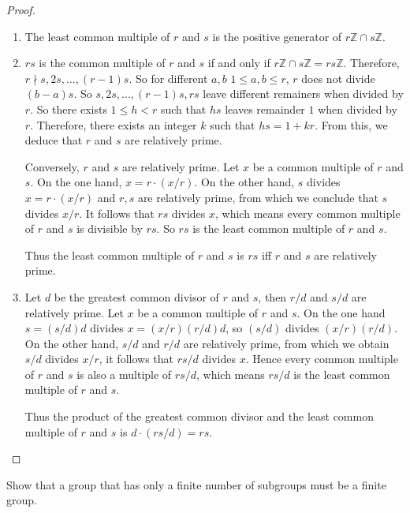 \begin{proof}
    \begin{enumerate}[label={\textbf{\alph*.}}]
        \item The least common multiple of $r$ and $s$ is the positive generator of $r\mathbb{Z}\cap s\mathbb{Z}$.
        \item $rs$ is the common multiple of $r$ and $s$ if and only if $r\mathbb{Z}\cap s\mathbb{Z} = rs\mathbb{Z}$. Therefore, $r \nmid s, 2s, \ldots, (r-1)s$. So for different $a, b$ $1\leq a, b \leq r$, $r$ does not divide $(b - a)s$. So $s, 2s, \ldots, (r-1)s, rs$ leave different remainers when divided by $r$. So there exists $1 \leq h < r$ such that $hs$ leaves remainder $1$ when divided by $r$. Therefore, there exists an integer $k$ such that $hs = 1 + kr$. From this, we deduce that $r$ and $s$ are relatively prime.

              Conversely, $r$ and $s$ are relatively prime. Let $x$ be a common multiple of $r$ and $s$. On the one hand, $x = r\cdot (x/r)$. On the other hand, $s$ divides $x = r\cdot (x/r)$ and $r, s$ are relatively prime, from which we conclude that $s$ divides $x/r$. It follows that $rs$ divides $x$, which means every common multiple of $r$ and $s$ is divisible by $rs$. So $rs$ is the least common multiple of $r$ and $s$.

              Thus the least common multiple of $r$ and $s$ is $rs$ iff $r$ and $s$ are relatively prime.
        \item Let $d$ be the greatest common divisor of $r$ and $s$, then $r/d$ and $s/d$ are relatively prime. Let $x$ be a common multiple of $r$ and $s$. On the one hand $s = (s/d)d$ divides $x = (x/r)(r/d)d$, so $(s/d)$ divides $(x/r)(r/d)$. On the other hand, $s/d$ and $r/d$ are relatively prime, from which we obtain $s/d$ divides $x/r$, it follows that $rs/d$ divides $x$. Hence every common multiple of $r$ and $s$ is also a multiple of $rs/d$, which means $rs/d$ is the least common multiple of $r$ and $s$.

              Thus the product of the greatest common divisor and the least common multiple of $r$ and $s$ is $d\cdot (rs/d) = rs$.
    \end{enumerate}
\end{proof}

\begin{exercise}
    Show that a group that has only a finite number of subgroups must be a finite group.
\end{exercise}

